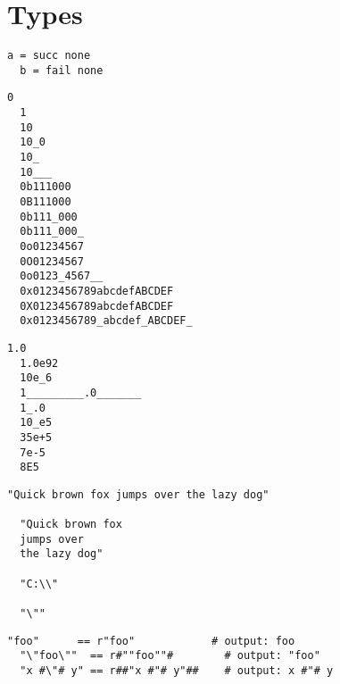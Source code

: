 \chapter{Types}

\begin{example}[None]
\begin{lstlisting}[language=intentio]
  a = succ none
  b = fail none
\end{lstlisting}
\end{example}

\begin{example}[Integer]
\begin{lstlisting}[language=intentio]
  0
  1
  10
  10_0
  10_
  10___
  0b111000
  0B111000
  0b111_000
  0b111_000_
  0o01234567
  0O01234567
  0o0123_4567__
  0x0123456789abcdefABCDEF
  0X0123456789abcdefABCDEF
  0x0123456789_abcdef_ABCDEF_
\end{lstlisting}
\end{example}

\begin{example}[Float]
\begin{lstlisting}[language=intentio]
  1.0
  1.0e92
  10e_6
  1_________.0_______
  1_.0
  10_e5
  35e+5
  7e-5
  8E5
\end{lstlisting}
\end{example}

\begin{example}[String]
\begin{lstlisting}[language=intentio,mathescape=true]
  "Quick brown fox jumps over the lazy dog"

  "Quick brown fox
  jumps over
  the lazy dog"

  "C:\\"

  "\""
\end{lstlisting}
\end{example}

\begin{example}
\begin{lstlisting}[language=intentio]
  "foo"      == r"foo"            # output: foo
  "\"foo\""  == r#""foo""#        # output: "foo"
  "x #\"# y" == r##"x #"# y"##    # output: x #"# y
\end{lstlisting}
\end{example}

